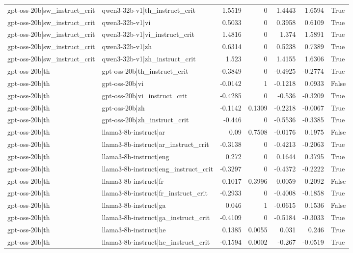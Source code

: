 \begin{table}
\begin{tabular}{l l r r r r l}
gpt-oss-20b|sw_instruct_crit & qwen3-32b-v1|th_instruct_crit & 1.5519 & 0 & 1.4443 & 1.6594 & True \\
gpt-oss-20b|sw_instruct_crit & qwen3-32b-v1|vi & 0.5033 & 0 & 0.3958 & 0.6109 & True \\
gpt-oss-20b|sw_instruct_crit & qwen3-32b-v1|vi_instruct_crit & 1.4816 & 0 & 1.374 & 1.5891 & True \\
gpt-oss-20b|sw_instruct_crit & qwen3-32b-v1|zh & 0.6314 & 0 & 0.5238 & 0.7389 & True \\
gpt-oss-20b|sw_instruct_crit & qwen3-32b-v1|zh_instruct_crit & 1.523 & 0 & 1.4155 & 1.6306 & True \\
gpt-oss-20b|th & gpt-oss-20b|th_instruct_crit & -0.3849 & 0 & -0.4925 & -0.2774 & True \\
gpt-oss-20b|th & gpt-oss-20b|vi & -0.0142 & 1 & -0.1218 & 0.0933 & False \\
gpt-oss-20b|th & gpt-oss-20b|vi_instruct_crit & -0.4285 & 0 & -0.536 & -0.3209 & True \\
gpt-oss-20b|th & gpt-oss-20b|zh & -0.1142 & 0.1309 & -0.2218 & -0.0067 & True \\
gpt-oss-20b|th & gpt-oss-20b|zh_instruct_crit & -0.446 & 0 & -0.5536 & -0.3385 & True \\
gpt-oss-20b|th & llama3-8b-instruct|ar & 0.09 & 0.7508 & -0.0176 & 0.1975 & False \\
gpt-oss-20b|th & llama3-8b-instruct|ar_instruct_crit & -0.3138 & 0 & -0.4213 & -0.2063 & True \\
gpt-oss-20b|th & llama3-8b-instruct|eng & 0.272 & 0 & 0.1644 & 0.3795 & True \\
gpt-oss-20b|th & llama3-8b-instruct|eng_instruct_crit & -0.3297 & 0 & -0.4372 & -0.2222 & True \\
gpt-oss-20b|th & llama3-8b-instruct|fr & 0.1017 & 0.3996 & -0.0059 & 0.2092 & False \\
gpt-oss-20b|th & llama3-8b-instruct|fr_instruct_crit & -0.2933 & 0 & -0.4008 & -0.1858 & True \\
gpt-oss-20b|th & llama3-8b-instruct|ga & 0.046 & 1 & -0.0615 & 0.1536 & False \\
gpt-oss-20b|th & llama3-8b-instruct|ga_instruct_crit & -0.4109 & 0 & -0.5184 & -0.3033 & True \\
gpt-oss-20b|th & llama3-8b-instruct|he & 0.1385 & 0.0055 & 0.031 & 0.246 & True \\
gpt-oss-20b|th & llama3-8b-instruct|he_instruct_crit & -0.1594 & 0.0002 & -0.267 & -0.0519 & True \\

\end{tabular}
\end{table}
